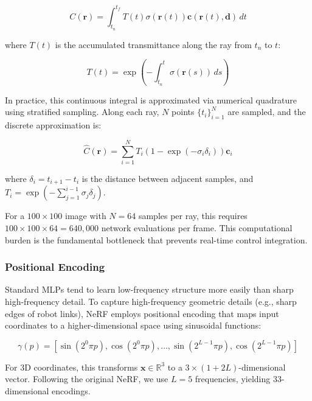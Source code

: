 ﻿\documentclass[12pt,a4paper,oneside]{report}
\begin{document}
\begin{equation}
C(\mathbf{r}) = \int_{t_n}^{t_f} T(t) \sigma(\mathbf{r}(t)) \mathbf{c}(\mathbf{r}(t), \mathbf{d}) \, dt
\end{equation}

where $T(t)$ is the accumulated transmittance along the ray from $t_n$ to $t$:

\begin{equation}
T(t) = \exp\left(-\int_{t_n}^{t} \sigma(\mathbf{r}(s)) \, ds\right)
\end{equation}

In practice, this continuous integral is approximated via numerical quadrature using stratified sampling. Along each ray, $N$ points $\{t_i\}_{i=1}^N$ are sampled, and the discrete approximation is:

\begin{equation}
\hat{C}(\mathbf{r}) = \sum_{i=1}^{N} T_i (1 - \exp(-\sigma_i \delta_i)) \mathbf{c}_i
\end{equation}

where $\delta_i = t_{i+1} - t_i$ is the distance between adjacent samples, and $T_i = \exp\left(-\sum_{j=1}^{i-1} \sigma_j \delta_j\right)$.

For a $100 \times 100$ image with $N = 64$ samples per ray, this requires $100 \times 100 \times 64 = 640,000$ network evaluations per frame. This computational burden is the fundamental bottleneck that prevents real-time control integration.

\subsubsection{Positional Encoding}

Standard MLPs tend to learn low-frequency structure more easily than sharp high-frequency detail. To capture high-frequency geometric details (e.g., sharp edges of robot links), NeRF employs positional encoding that maps input coordinates to a higher-dimensional space using sinusoidal functions:

\begin{equation}
\gamma(p) = [\sin(2^0 \pi p), \cos(2^0 \pi p), \ldots, \sin(2^{L-1} \pi p), \cos(2^{L-1} \pi p)]
\end{equation}

For 3D coordinates, this transforms $\mathbf{x} \in \mathbb{R}^3$ to a $3 \times (1 + 2L)$-dimensional vector. Following the original NeRF, we use $L = 5$ frequencies, yielding 33-dimensional encodings.
\end{document}
